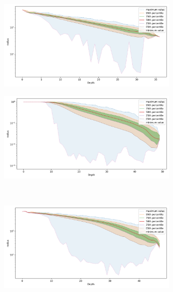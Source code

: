 \documentclass{article}
\begin{document}
\begin{figure}[ht!]
    \begin{subfigure}[b]{0.47\textwidth}
    \includegraphics[width=0.95\textwidth]{images/radius/fashion-mnist-60000.png}\\
    \label{fig:results:fashion-mnist-radius}
    \end{subfigure}%
    \begin{subfigure}[b]{0.47\textwidth}
    \includegraphics[width=0.95\textwidth]{images/radius/glove-25-1183514.png}\\
    \label{fig:results:glove-25-radius}
    \end{subfigure}
    \vspace{1em}
    \\
    \begin{subfigure}[b]{0.47\textwidth}
    \includegraphics[width=0.95\textwidth]{images/radius/sift-1000000.png}\\

\end{subfigure}
\end{figure}
\end{document}

